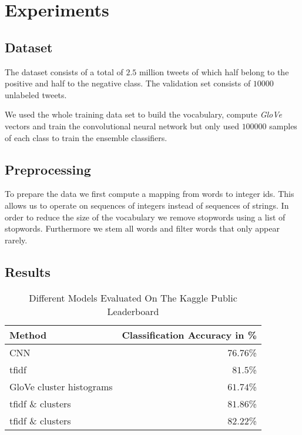 
\section{Experiments}

\subsection{Dataset}

The dataset consists of a total of $2.5$ million tweets of which half belong to
the positive and half to the negative class. The validation set consists of
$10000$ unlabeled tweets.

We used the whole training data set to build the
vocabulary, compute \textit{GloVe}~\cite{glove} vectors and train the 
convolutional neural network but only used $100000$ samples of each class to
train the ensemble classifiers.

\subsection{Preprocessing}

To prepare the data we first compute a mapping from words to integer ids. This
allows us to operate on sequences of integers instead of sequences of strings.
In order to reduce the size of the vocabulary we remove stopwords using a list
of stopwords. Furthermore we stem all words and filter words that only appear
rarely.

\subsection{Results}

\begin{table}[h]
    \centering
    \begin{tabular}{l r}
        Method & Classification Accuracy in \% \\
        \hline
        CNN & $76.76$\% \\
        tfidf & $81.5$\% \\
        GloVe cluster histograms & $61.74$\% \\
        tfidf \& clusters & $81.86$\% \\
        tfidf \& clusters\footnotemark{} & $82.22$\% \\
    \end{tabular}
    \caption{Different Models Evaluated On The Kaggle Public Leaderboard}\label{tab:res}
\end{table}

